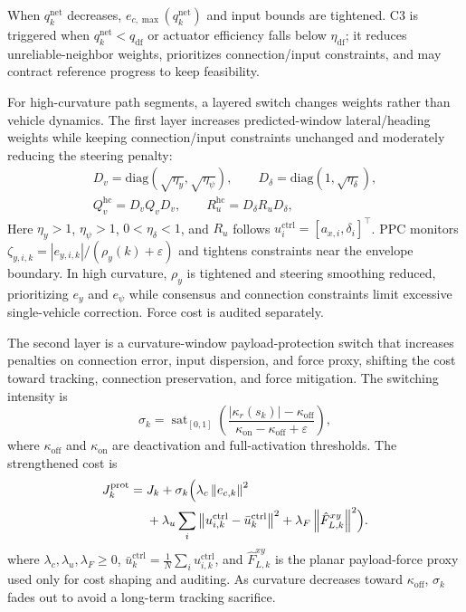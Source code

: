 \documentclass[letterpaper,journal]{IEEEtran}
\newcommand{\norm}[1]{\left\lVert #1 \right\rVert}
\begin{document}
\endgroup
When $q_k^{\mathrm{net}}$ decreases, $e_{c,\max}(q_k^{\mathrm{net}})$ and input bounds are tightened. C3 is triggered when $q_k^{\mathrm{net}}<q_{\mathrm{df}}$ or actuator efficiency falls below $\eta_{\mathrm{df}}$; it reduces unreliable-neighbor weights, prioritizes connection/input constraints, and may contract reference progress to keep feasibility.

For high-curvature path segments, a layered switch changes weights rather than vehicle dynamics. The first layer increases predicted-window lateral/heading weights while keeping connection/input constraints unchanged and moderately reducing the steering penalty:
\begin{equation}
\begin{gathered}
D_v=\mathrm{diag}(\sqrt{\eta_y},\sqrt{\eta_\psi}),\qquad
D_\delta=\mathrm{diag}(1,\sqrt{\eta_\delta}),\\
Q_v^{\mathrm{hc}}=D_v Q_v D_v,\qquad
R_u^{\mathrm{hc}}=D_\delta R_u D_\delta ,
\end{gathered}
\label{eq:high_curvature_lateral_priority}
\end{equation}
Here $\eta_y>1$, $\eta_\psi>1$, $0<\eta_\delta<1$, and $R_u$ follows $u_i^{\mathrm{ctrl}}=[a_{x,i},\delta_i]^\top$. PPC monitors $\zeta_{y,i,k}=|e_{y,i,k}|/(\rho_y(k)+\varepsilon)$ and tightens constraints near the envelope boundary. In high curvature, $\rho_y$ is tightened and steering smoothing reduced, prioritizing $e_y$ and $e_\psi$ while consensus and connection constraints limit excessive single-vehicle correction. Force cost is audited separately.

The second layer is a curvature-window payload-protection switch that increases penalties on connection error, input dispersion, and force proxy, shifting the cost toward tracking, connection preservation, and force mitigation. The switching intensity is
\begin{equation}
\sigma_k=\operatorname{sat}_{[0,1]}\!\left(
\frac{|\kappa_r(s_k)|-\kappa_{\mathrm{off}}}
{\kappa_{\mathrm{on}}-\kappa_{\mathrm{off}}+\varepsilon}
\right),
\label{eq:payload_protection_switch}
\end{equation}
where $\kappa_{\mathrm{off}}$ and $\kappa_{\mathrm{on}}$ are deactivation and full-activation thresholds. The strengthened cost is
\begingroup\small
\begin{equation}
\begin{aligned}
J_k^{\mathrm{prot}}
={}&J_k+\sigma_k\Bigl(
\lambda_c\norm{e_{c,k}}^2\\
&+\lambda_u\sum_i
\norm{u_{i,k}^{\mathrm{ctrl}}-\bar u_k^{\mathrm{ctrl}}}^2
+\lambda_F\norm{\hat F_{L,k}^{xy}}^2
\Bigr).
\end{aligned}
\label{eq:payload_protection_cost}
\end{equation}
\endgroup
where $\lambda_c,\lambda_u,\lambda_F\ge0$, $\bar u_k^{\mathrm{ctrl}}=\frac{1}{N}\sum_i u_{i,k}^{\mathrm{ctrl}}$, and $\hat F_{L,k}^{xy}$ is the planar payload-force proxy used only for cost shaping and auditing. As curvature decreases toward $\kappa_{\mathrm{off}}$, $\sigma_k$ fades out to avoid a long-term tracking sacrifice.
\end{document}
